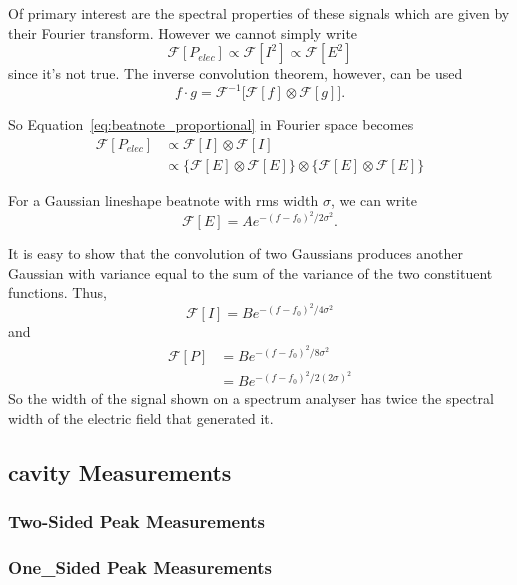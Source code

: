 Of primary interest are the spectral properties of these signals which are given by their Fourier transform.
However we cannot simply write
\begin{equation}
\mathcal{F}[P_{elec}]\propto \mathcal{F}[I^2] \propto \mathcal{F}[E^2]
\end{equation}
since it's not true.
The inverse convolution theorem, however, can be used
\begin{equation}
f\cdot g = \mathcal{F}^{-1} \bigg[ \mathcal{F}[f] \otimes\mathcal{F}[g]\bigg].
\end{equation}

So Equation~\ref{eq:beatnote_proportional} in Fourier space becomes
\begin{align}
\mathcal{F}[P_{elec}]&\propto \mathcal{F}[I]\otimes\mathcal{F}[I]\nonumber\\
&\propto \big\{\mathcal{F}[E] \otimes\mathcal{F}[E]\big\} \otimes\big\{\mathcal{F}[E] \otimes\mathcal{F}[E]\big\}
\end{align}

For a Gaussian lineshape beatnote with \gls{rms} width $\sigma$, we can write
\begin{equation}
\mathcal{F}[E] = A e^{-(f-f_0)^2/2\sigma^2}.
\end{equation}

It is easy to show that the convolution of two Gaussians produces another Gaussian with variance equal to the sum of the variance of the two constituent functions.
Thus,
\begin{equation}
\mathcal{F}[I] = B e^{-(f-f_0)^2/4\sigma^2}
\end{equation}
and
\begin{align}
\mathcal{F}[P] &= B e^{-(f-f_0)^2/8\sigma^2}\nonumber\\
&= B e^{-(f-f_0)^2/2(2\sigma)^2}
\end{align}
So the width of the signal shown on a spectrum analyser has twice the spectral width of the electric field that generated it.

\subsection{cavity Measurements}

\subsubsection{Two-Sided Peak Measurements}

\subsubsection{One_Sided Peak Measurements}

